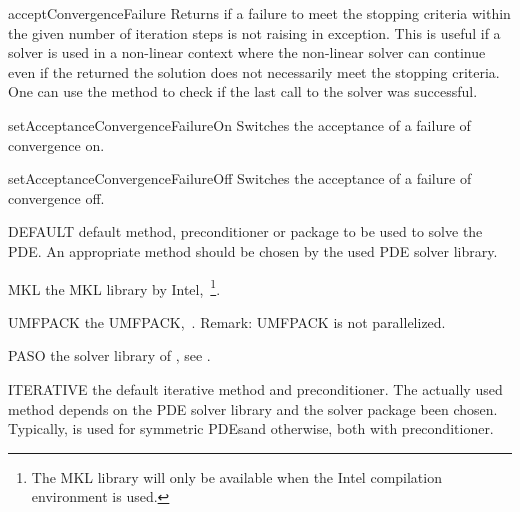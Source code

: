 \begin{methoddesc}[SolverOptions]{acceptConvergenceFailure}{}
Returns \True if a failure to meet the stopping criteria within the
given number of iteration steps is not raising in exception. This is useful 
if a solver is used in a non-linear context where the non-linear solver can 
continue even if the returned the solution does not necessarily meet the
stopping criteria. One can use the  method to check if the
last call to the solver was successful.
\end{methoddesc}

\begin{methoddesc}[SolverOptions]{setAcceptanceConvergenceFailureOn}{}
Switches the acceptance of a failure of convergence on.  
\end{methoddesc}

\begin{methoddesc}[SolverOptions]{setAcceptanceConvergenceFailureOff}{}
Switches the acceptance of a failure of convergence off.
\end{methoddesc}
    
\begin{memberdesc}[SolverOptions]{DEFAULT}
default method, preconditioner or package to be used to solve the PDE. An appropriate method should be
chosen by the used PDE solver library.
\end{memberdesc}

\begin{memberdesc}[SolverOptions]{MKL}
the MKL library by Intel,~\footnote{The MKL library will only be available when the Intel compilation environment is used.}.
\end{memberdesc}

\begin{memberdesc}[SolverOptions]{UMFPACK}
the UMFPACK,~. Remark: UMFPACK is not parallelized.
\end{memberdesc}

\begin{memberdesc}[SolverOptions]{PASO}
the solver library of \finley, see .
\end{memberdesc}

\begin{memberdesc}[SolverOptions]{ITERATIVE}
the default iterative method and preconditioner. The actually used method depends on the PDE solver library and the solver package been chosen. Typically, \PCG is used for symmetric PDEsand \BiCGStab otherwise, both with \JACOBI preconditioner.
\end{memberdesc}

